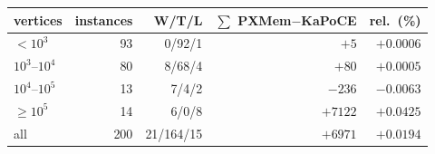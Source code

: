 \begin{tabular}{lrrrr}
\toprule
vertices & instances & W/T/L & $\sum$ PXMem$-$KaPoCE & rel.\ (\%) \\
\midrule
$<10^3$ & 93 & 0/92/1 & $+5$ & $+0.0006$ \\
$10^3$--$10^4$ & 80 & 8/68/4 & $+80$ & $+0.0005$ \\
$10^4$--$10^5$ & 13 & 7/4/2 & $-236$ & $-0.0063$ \\
$\ge 10^5$ & 14 & 6/0/8 & $+7122$ & $+0.0425$ \\
\midrule
all & 200 & 21/164/15 & $+6971$ & $+0.0194$ \\
\bottomrule
\end{tabular}
